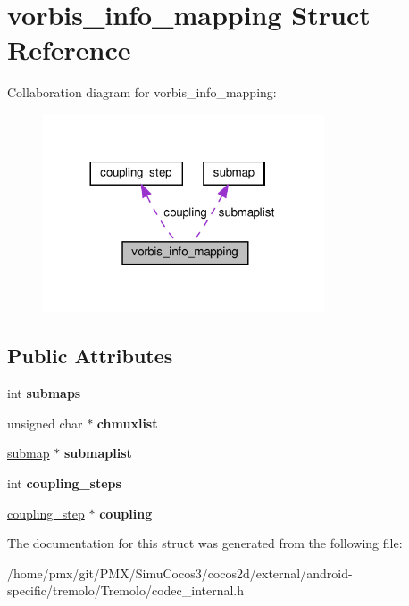 \hypertarget{structvorbis__info__mapping}{}\section{vorbis\+\_\+info\+\_\+mapping Struct Reference}
\label{structvorbis__info__mapping}


Collaboration diagram for vorbis\+\_\+info\+\_\+mapping\+:
\nopagebreak
\begin{figure}[H]
\begin{center}
\leavevmode
\includegraphics[width=236pt]{structvorbis__info__mapping__coll__graph}
\end{center}
\end{figure}
\subsection*{Public Attributes}
\begin{DoxyCompactItemize}
\item 
\mbox{\label{structvorbis__info__mapping_a98371877e3bbfb30951cba9060832720}} 
int {\bfseries submaps}
\item 
\mbox{\label{structvorbis__info__mapping_a7eb46437f255baf3e1fa1e1a9b031432}} 
unsigned char $\ast$ {\bfseries chmuxlist}
\item 
\mbox{\label{structvorbis__info__mapping_ae35afea952bc964dd453153eaea2c068}} 
\hyperlink{structsubmap}{submap} $\ast$ {\bfseries submaplist}
\item 
\mbox{\label{structvorbis__info__mapping_a2d9ff0f93372e5ba9fc14d1c1cf747b0}} 
int {\bfseries coupling\+\_\+steps}
\item 
\mbox{\label{structvorbis__info__mapping_a6eb42140b9c8d844277bdc382695022a}} 
\hyperlink{structcoupling__step}{coupling\+\_\+step} $\ast$ {\bfseries coupling}
\end{DoxyCompactItemize}


The documentation for this struct was generated from the following file\+:\begin{DoxyCompactItemize}
\item 
/home/pmx/git/\+P\+M\+X/\+Simu\+Cocos3/cocos2d/external/android-\/specific/tremolo/\+Tremolo/codec\+\_\+internal.\+h\end{DoxyCompactItemize}
